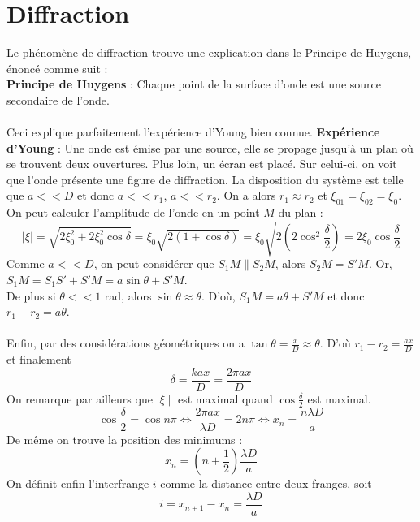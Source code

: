 \section{Diffraction}
Le phénomène de diffraction trouve une explication dans le Principe de Huygens, énoncé comme suit :\\
\textbf{Principe de Huygens} : Chaque point de la surface d'onde est une source secondaire de l'onde.\\\\
Ceci explique parfaitement l'expérience d'Young bien connue.
\textbf{Expérience d'Young} : Une onde est émise par une source, elle se propage jusqu'à un plan où se trouvent deux ouvertures. Plus loin, un écran est placé. Sur celui-ci, on voit que l'onde présente une figure de diffraction.
La disposition du système est telle que $a<<D$ et donc $a<<r_1$, $a<<r_2$. On a alors $r_1\approx r_2$ et $\xi_{01}=\xi_{02}=\xi_0$. On peut calculer l'amplitude de l'onde en un point $M$ du plan :
\[ \mid\xi\mid=\sqrt{2\xi_0^2+2\xi_0^2\cos\delta}=\xi_0\sqrt{2(1+\cos\delta)}=\xi_0\sqrt{2(2\cos^2\frac{\delta}{2})}=2\xi_0\cos\frac{\delta}{2} \]
Comme $a<<D$, on peut considérer que $S_1M \parallel S_2M$, alors $S_2M=S'M$. Or, $S_1M=S_1S'+S'M=a\sin\theta+S'M$.\\
De plus si $\theta<<1$ rad, alors $\sin\theta\approx\theta$. D'où, $S_1M=a\theta+S'M$ et donc $r_1-r_2=a\theta$.\\\\
Enfin, par des considérations géométriques on a $\tan\theta=\frac{x}{D}\approx\theta$. D'où $r_1-r_2=\frac{ax}{D}$ et finalement
\[ \delta=\frac{kax}{D}=\frac{2\pi ax}{D} \]
On remarque par ailleurs que $\mid\xi\mid$ est maximal quand $\cos\frac{\delta}{2}$ est maximal.
\[ \cos\frac{\delta}{2}=\cos n\pi\Leftrightarrow \frac{2\pi ax}{\lambda D}=2n\pi\Leftrightarrow x_n=\frac{n\lambda D}{a} \]
De même on trouve la position des minimums :
\[ x_n=(n+\frac{1}{2})\frac{\lambda D}{a} \]
On définit enfin l'interfrange $i$ comme la distance entre deux franges, soit
\[ i=x_{n+1}-x_n=\frac{\lambda D}{a} \]

